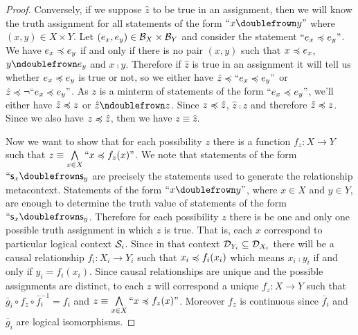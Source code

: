 \documentclass[11pt,letterpaper,fleqn]{memoir} %
\begin{document}
\begin{mathSection}
\begin{proof}
	Conversely, if we suppose $\hat{z}$ to be true in an assignment, then we will know the truth assignment for all statements of the form $``x \comp y"$ where $(x,y) \in X \times Y$. Let $(e_x, e_y) \in \mathcal{B}_X \times \mathcal{B}_Y$ and consider the statement $``e_x \preccurlyeq e_y"$. We have $e_x \preccurlyeq e_y$ if and only if there is no pair $(x,y)$ such that $x \preccurlyeq e_x$, $y \ncomp e_y$ and $x \comp y$. Therefore if $\hat{z}$ is true in an assignment it will tell us whether $e_x \preccurlyeq e_y$ is true or not, so we either have $\hat{z} \preccurlyeq ``e_x \preccurlyeq e_y"$ or $\hat{z} \preccurlyeq \neg ``e_x \preccurlyeq e_y"$. As $z$ is a minterm of statements of the form $``e_x \preccurlyeq e_y"$, we'll either have $\hat{z} \preccurlyeq z$ or $\hat{z} \ncomp z$. Since $z \preccurlyeq \hat{z}$,  $\hat{z} \comp z$ and therefore $\hat{z} \preccurlyeq z$. Since we also have $z \preccurlyeq \hat{z}$, then we have $z \equiv \hat{z}$.
	
	Now we want to show that for each possibility $z$ there is a function $f_z : X \to Y$ such that $z\equiv\bigwedge\limits_{x\in X} ``x \preccurlyeq f_z(x)"$. We note that statements of the form $``\stmt_x \comp \stmt_y$ are precisely the statements used to generate the relationship metacontext. Statements of the form $``x \comp y"$, where $x \in X$ and $y \in Y$, are enough to determine the truth value of statements of the form $``\stmt_x \comp \stmt_y$. Therefore for each possibility $z$ there is be one and only one possible truth assignment in which $z$ is true. That is, each $x$ correspond to particular logical context $\mathcal{S}_i$. Since in that context $\mathcal{D}_{Y_i} \subseteq \mathcal{D}_{X_i}$ there will be a causal relationship $f_i : X_i \to Y_i$ such that $x_i \preccurlyeq f_i (x_i)$ which means $x_i \comp y_i$ if and only if $y_i = f_i(x_i)$. Since causal relationships are unique and the possible assignments are distinct, to each $z$ will correspond a unique $f_z : X \to Y$ such that $\bar{g}_i \circ f_z \circ \bar{f}^{-1}_i = f_i$ and $z\equiv\bigwedge\limits_{x\in X} ``x \preccurlyeq f_z(x)"$. Moreover $f_z$ is continuous since $\bar{f}_i$ and $\bar{g}_i$ are logical isomorphisms.
\end{proof}
\end{mathSection}
\end{document}
